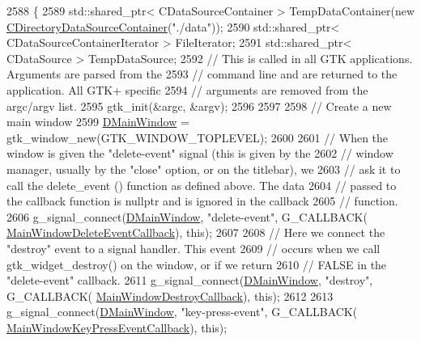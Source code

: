 \begin{DoxyCode}
2588                                                 \{
2589     std::shared\_ptr< CDataSourceContainer > TempDataContainer(\textcolor{keyword}{new} 
      \hyperlink{classCDirectoryDataSourceContainer}{CDirectoryDataSourceContainer}(\textcolor{stringliteral}{"./data"}));
2590     std::shared\_ptr< CDataSourceContainerIterator > FileIterator;
2591     std::shared\_ptr< CDataSource > TempDataSource;
2592     \textcolor{comment}{// This is called in all GTK applications. Arguments are parsed from the }
2593     \textcolor{comment}{// command line and are returned to the application. All GTK+ specific }
2594     \textcolor{comment}{// arguments are removed from the argc/argv list.}
2595     gtk\_init(&argc, &argv);
2596     
2597     
2598     \textcolor{comment}{// Create a new main window }
2599     \hyperlink{classCApplicationData_af3c57a84b4ecca8a7f86b67a0ae55372}{DMainWindow} = gtk\_window\_new(GTK\_WINDOW\_TOPLEVEL);
2600     
2601     \textcolor{comment}{// When the window is given the "delete-event" signal (this is given by the }
2602     \textcolor{comment}{// window manager, usually by the "close" option, or on the titlebar), we }
2603     \textcolor{comment}{// ask it to call the delete\_event () function as defined above. The data }
2604     \textcolor{comment}{// passed to the callback function is nullptr and is ignored in the callback }
2605     \textcolor{comment}{// function. }
2606     g\_signal\_connect(\hyperlink{classCApplicationData_af3c57a84b4ecca8a7f86b67a0ae55372}{DMainWindow}, \textcolor{stringliteral}{"delete-event"}, G\_CALLBACK(
      \hyperlink{classCApplicationData_a4b2110c03e030cf11b733955963f8854}{MainWindowDeleteEventCallback}), \textcolor{keyword}{this});
2607     
2608     \textcolor{comment}{// Here we connect the "destroy" event to a signal handler. This event }
2609     \textcolor{comment}{// occurs when we call gtk\_widget\_destroy() on the window, or if we return }
2610     \textcolor{comment}{// FALSE in the "delete-event" callback. }
2611     g\_signal\_connect(\hyperlink{classCApplicationData_af3c57a84b4ecca8a7f86b67a0ae55372}{DMainWindow}, \textcolor{stringliteral}{"destroy"}, G\_CALLBACK(
      \hyperlink{classCApplicationData_a379327c78dc57aa9dcef77e1b98efa2d}{MainWindowDestroyCallback}), \textcolor{keyword}{this});
2612     
2613     g\_signal\_connect(\hyperlink{classCApplicationData_af3c57a84b4ecca8a7f86b67a0ae55372}{DMainWindow}, \textcolor{stringliteral}{"key-press-event"}, G\_CALLBACK(
      \hyperlink{classCApplicationData_aca6cce5b1cd5142984d2880294ff6ed4}{MainWindowKeyPressEventCallback}), \textcolor{keyword}{this});

\end{DoxyCode}
